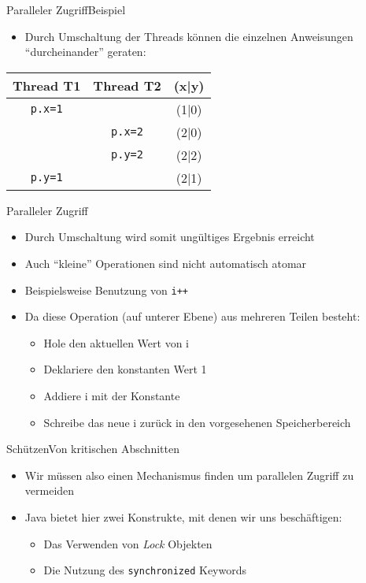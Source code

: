 \begin{frame}{Paralleler Zugriff}{Beispiel}
    \begin{itemize}
        \item Durch Umschaltung der Threads können die einzelnen Anweisungen "`durcheinander"' geraten:
    \end{itemize}
    \begin{tabular}{|c|c|c|}
    \hline
    \textbf{Thread T1}&\textbf{Thread T2}&\textbf{(x|y)}\\\hline
    \texttt{p.x=1}&&(1|0)\\\hline
    &\texttt{p.x=2}&(2|0)\\\hline
    &\texttt{p.y=2}&(2|2)\\\hline
    \texttt{p.y=1}&&(2|1)\\\hline
    \end{tabular}
\end{frame}

\begin{frame}{Paralleler Zugriff}{}
    \begin{itemize}
        \item Durch Umschaltung wird somit ungültiges Ergebnis erreicht
        \item Auch "`kleine"' Operationen sind nicht automatisch atomar
        \item Beispielsweise Benutzung von \texttt{i++}
        \item Da diese Operation (auf unterer Ebene) aus mehreren Teilen besteht:
        \begin{itemize}
            \item Hole den aktuellen Wert von i
            \item Deklariere den konstanten Wert 1
            \item Addiere i mit der Konstante
            \item Schreibe das neue i zurück in den vorgesehenen Speicherbereich
        \end{itemize}
    \end{itemize}
\end{frame}

\begin{frame}{Schützen}{Von kritischen Abschnitten}
    \begin{itemize}
        \item Wir müssen also einen Mechanismus finden um parallelen Zugriff zu vermeiden
        \item Java bietet hier zwei Konstrukte, mit denen wir uns beschäftigen:
        \begin{itemize}
            \item Das Verwenden von \textit{Lock} Objekten
            \item Die Nutzung des \texttt{synchronized} Keywords
        \end{itemize}
    \end{itemize}
\end{frame}